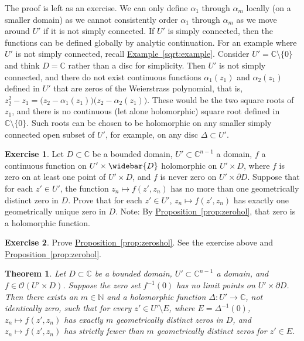 \documentclass[12pt,openany]{book}
\newcommand{\C}{{\mathbb{C}}}
\newcommand{\N}{{\mathbb{N}}}
\newcommand{\sO}{{\mathscr{O}}}
\theoremstyle{plain}
\newtheorem{thm}{Theorem}[section]
\theoremstyle{remark}
\theoremstyle{definition}
\newenvironment{exbox}{%
    \def\FrameCommand{\vrule width 1pt \relax\hspace{10pt}}%
    \MakeFramed{\advance\hsize-\width\FrameRestore}%
}{%
    \endMakeFramed
}
\theoremstyle{exercise}
\newtheorem{exercise}{Exercise}[section]
\theoremstyle{example}
\newcommand{\exampleref}[1]{\hyperref[#1]{Example~\ref*{#1}}}
\newcommand{\propref}[1]{\hyperref[#1]{Proposition~\ref*{#1}}}
\begin{document}
The proof is left as an exercise.
We can only define $\alpha_1$ through $\alpha_m$ locally (on a
smaller domain) as we cannot consistently order
$\alpha_1$ through $\alpha_m$ as we move around
$U'$ if it is not simply connected.  If $U'$ is simply connected, then
the functions can be defined globally by analytic continuation.
For an example where $U'$ is not simply connected,
recall \exampleref{sqrt:example}. Consider $U' = \C \setminus \{ 0 \}$ and
think $D=\C$ rather than a disc for simplicity.  Then $U'$ is not simply
connected, and there do not exist continuous functions
$\alpha_1(z_1)$ and
$\alpha_2(z_1)$ defined in $U'$ that are zeros
of the Weierstrass polynomial, that is,
$z_2^2 - z_1 =
\bigl(z_2-\alpha_1(z_1) \bigr)
\bigl(z_2-\alpha_2(z_1) \bigr)$.
These would be the two square roots of $z_1$, and there is no continuous
(let alone holomorphic) square root defined in $\C \setminus \{ 0 \}$.
Such roots can be chosen to be holomorphic on any smaller
simply connected open subset of $U'$, for
example, on any disc $\Delta \subset U'$.


\begin{exbox}
\begin{exercise}
Let $D \subset \C$ be a bounded domain, $U' \subset \C^{n-1}$
a domain,
$f$ a continuous function on $U' \times \widebar{D}$ holomorphic
on $U' \times D$,
where $f$ is zero on at least one point
of $U' \times D$, and $f$ is never zero on
$U' \times \partial D$.
Suppose that for each $z' \in U'$, the function
$z_n \mapsto f(z',z_n)$
has no more than one geometrically distinct zero in $D$.  Prove that for each $z' \in U'$,
$z_n \mapsto f(z',z_n)$ has exactly one geometrically unique zero in $D$.
Note: By \propref{prop:zerohol}, that zero is
a holomorphic function.
\end{exercise}

\begin{exercise}
Prove \propref{prop:zeroshol}.
See the exercise above and \propref{prop:zerohol}.
\end{exercise}
\end{exbox}

\begin{thm} \label{thm:discrthm}
\pagebreak[2]
Let $D \subset \C$ be a bounded domain,
$U' \subset \C^{n-1}$ a domain,
and
$f \in \sO(U' \times D)$.
Suppose the zero set $f^{-1}(0)$ has no limit points
on $U' \times \partial D$.
Then there exists an $m \in \N$
and
a holomorphic function $\Delta \colon U' \to \C$, not identically zero, such
that for every $z' \in U' \setminus E$, where $E = \Delta^{-1}(0)$,
$z_n \mapsto f(z',z_n)$ has exactly $m$ geometrically distinct zeros in $D$,
and $z_n \mapsto f(z',z_n)$ has strictly fewer than $m$ geometrically distinct
zeros for $z' \in E$.
\end{thm}
\end{document}
